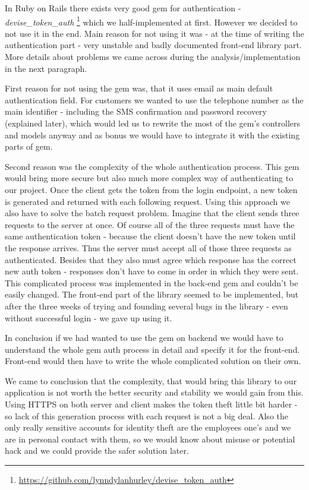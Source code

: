 In Ruby on Rails there exists very good gem for authentication - \textit{devise\_token\_auth} \footnote{\url{https://github.com/lynndylanhurley/devise\_token\_auth}} which we half-implemented at first. However we decided to not use it in the end. Main reason for not using it was - at the time of writing the authentication part - very unstable and badly documented front-end library part. More details about problems we came across during the analysis/implementation in the next paragraph.

First reason for not using the gem was, that it uses email as main default authentication field. For customers we wanted to use the telephone number as the main identifier - including the SMS confirmation and password recovery (explained later), which would led us to rewrite the most of the gem's controllers and models anyway and as bonus we would have to integrate it with the existing parts of gem.

Second reason was the complexity of the whole authentication process. This gem would bring more secure but also much more complex way of authenticating to our project. Once the client gets the token from the login endpoint, a new token is generated and returned with each following request. Using this approach we also have to solve the batch request problem. Imagine that the client sends three requests to the server at once. Of course all of the three requests must have the same authentication token - because the client doesn't have the new token until the response arrives. Thus the server must accept all of those three requests as authenticated. Besides that they also must agree which response has the correct new auth token - responses don't have to come in order in which they were sent. This complicated process was implemented in the back-end gem and couldn't be easily changed. The front-end part of the library seemed to be implemented, but after the three weeks of trying and founding several bugs in the library - even without successful login - we gave up using it.

In conclusion if we had wanted to use the gem on backend we would have to understand the whole gem auth process in detail and specify it for the front-end. Front-end would then have to write the whole complicated solution on their own. 

We came to conclusion that the complexity, that would bring this library to our application is not worth the better security and stability we would gain from this. Using HTTPS on both server and client makes the token theft little bit harder - so lack of this generation process with each request is not a big deal. Also the only really sensitive accounts for identity theft are the employees one's and we are in personal contact with them, so we would know about misuse or potential hack and we could provide the safer solution later.

